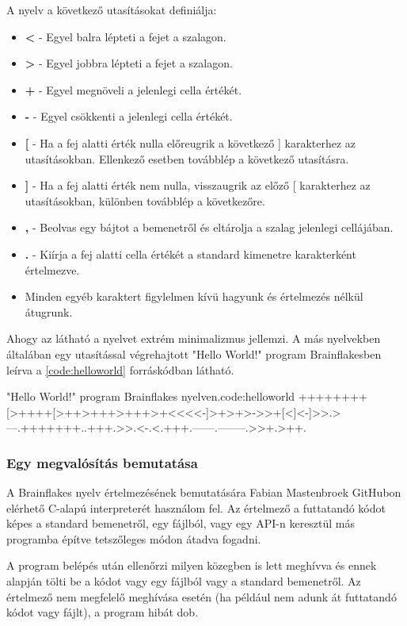 A nyelv a következő utasításokat definiálja:

\begin{itemize}
    \item \textbf{<} - Egyel balra lépteti a fejet a szalagon.
    \item \textbf{>} - Egyel jobbra lépteti a fejet a szalagon.
    \item \textbf{+} - Egyel megnöveli a jelenlegi cella értékét.
    \item \textbf{-} - Egyel csökkenti a jelenlegi cella értékét.
    \item \textbf{[} - Ha a fej alatti érték nulla előreugrik a következő ] karakterhez az utasításokban. Ellenkező esetben továbblép a következő utasításra. 
    \item \textbf{]} - Ha a fej alatti érték nem nulla, visszaugrik az előző [ karakterhez az utasításokban, különben továbblép a következőre.
    \item \textbf{,} - Beolvas egy bájtot a bemenetről és eltárolja a szalag jelenlegi cellájában.
    \item \textbf{.} - Kiírja a fej alatti cella értékét a standard kimenetre karakterként értelmezve.
    \item Minden egyéb karaktert figylelmen kívü hagyunk és értelmezés nélkül átugrunk.
\end{itemize}

Ahogy az látható a nyelvet extrém minimalizmus jellemzi. A más nyelvekben általában egy utasítással végrehajtott "Hello World!" program Brainflakesben leírva a \ref{code:helloworld} forráskódban látható.

\begin{code}{"Hello World!" program Brainflakes nyelven.}{code:helloworld}
++++++++[>++++[>++>+++>+++>+<<<<-]>+>+>->>+[<]<-]>>.>---.+++++++..+++.>>.<-.<.+++.------.--------.>>+.>++.
\end{code}

\subsubsection{Egy megvalósítás bemutatása}

A Brainflakes nyelv értelmezésének bemutatására Fabian Mastenbroek GitHubon elérhető C-alapú interpreterét\cite{bfimpl} használom fel. Az értelmező a futtatandó kódot képes a standard bemenetről, egy fájlból, vagy egy API-n keresztül más programba építve tetszőleges módon átadva fogadni.

A program belépés után ellenőrzi milyen közegben is lett meghívva és ennek alapján tölti be a kódot vagy egy fájlból vagy a standard bemenetről. Az értelmező nem megfelelő meghívása esetén (ha például nem adunk át futtatandó kódot vagy fájlt), a program hibát dob. 

